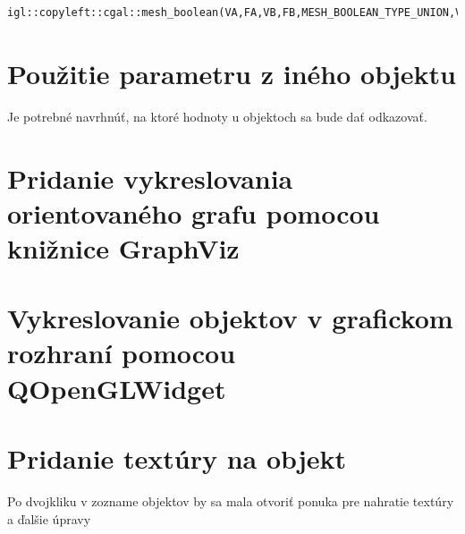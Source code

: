 \begin{lstlisting}
igl::copyleft::cgal::mesh_boolean(VA,FA,VB,FB,MESH_BOOLEAN_TYPE_UNION,VC,FC);
\end{lstlisting}


\section{Použitie parametru z iného objektu}
Je potrebné navrhnúť, na ktoré hodnoty u objektoch sa bude dať odkazovať. 

\section{Pridanie vykreslovania orientovaného grafu pomocou knižnice GraphViz}


\section{Vykreslovanie objektov v grafickom rozhraní pomocou QOpenGLWidget}

\section{Pridanie textúry na objekt}
Po dvojkliku v zozname objektov by sa mala otvoriť ponuka pre nahratie textúry a ďalšie úpravy

